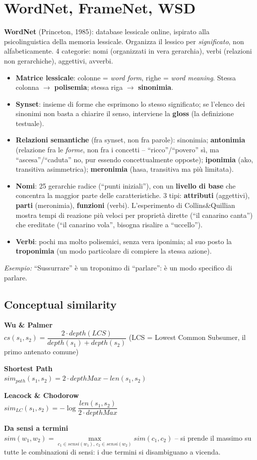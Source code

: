 \documentclass[11pt,a4paper]{article}
\newcommand{\formula}[2]{\begin{formulabox}\textbf{#1}\\[3pt]#2\end{formulabox}}
\newcommand{\es}[1]{\begin{esbox}\textit{Esempio:} #1\end{esbox}}
\begin{document}
\section{WordNet, FrameNet, WSD}

\textbf{WordNet} (Princeton, 1985): database lessicale online, ispirato alla psicolinguistica della memoria lessicale. Organizza il lessico per \emph{significato}, non alfabeticamente. 4 categorie: nomi (organizzati in vera gerarchia), verbi (relazioni non gerarchiche), aggettivi, avverbi.

\begin{itemize}
  \item \textbf{Matrice lessicale}: colonne = \emph{word form}, righe = \emph{word meaning}. Stessa colonna $\to$ \textbf{polisemia}; stessa riga $\to$ \textbf{sinonimia}.
  \item \textbf{Synset}: insieme di forme che esprimono lo stesso significato; se l'elenco dei sinonimi non basta a chiarire il senso, interviene la \textbf{gloss} (la definizione testuale).
  \item \textbf{Relazioni semantiche} (fra synset, non fra parole): sinonimia; \textbf{antonimia} (relazione fra le \emph{forme}, non fra i concetti -- ``ricco''/``povero'' s\`i, ma ``ascesa''/``caduta'' no, pur essendo concettualmente opposte); \textbf{iponimia} (ako, transitiva asimmetrica); \textbf{meronimia} (hasa, transitiva ma pi\`u limitata).
  \item \textbf{Nomi}: 25 gerarchie radice (``punti iniziali''), con un \textbf{livello di base} che concentra la maggior parte delle caratteristiche. 3 tipi: \textbf{attributi} (aggettivi), \textbf{parti} (meronimia), \textbf{funzioni} (verbi). L'esperimento di Collins\&Quillian mostra tempi di reazione pi\`u veloci per propriet\`a dirette (``il canarino canta'') che ereditate (``il canarino vola'', bisogna risalire a ``uccello'').
  \item \textbf{Verbi}: pochi ma molto polisemici, senza vera iponimia; al suo posto la \textbf{troponimia} (un modo particolare di compiere la stessa azione).
\end{itemize}
\es{``Sussurrare'' \`e un troponimo di ``parlare'': \`e un modo specifico di parlare.}

\subsection*{Conceptual similarity}
\formula{Wu \& Palmer}{$cs(s_1,s_2) = \dfrac{2\cdot depth(LCS)}{depth(s_1)+depth(s_2)}$ \quad (LCS = Lowest Common Subsumer, il primo antenato comune)}
\formula{Shortest Path}{$sim_{path}(s_1,s_2) = 2\cdot depthMax - len(s_1,s_2)$}
\formula{Leacock \& Chodorow}{$sim_{LC}(s_1,s_2) = -\log\dfrac{len(s_1,s_2)}{2\cdot depthMax}$}
\formula{Da sensi a termini}{$sim(w_1,w_2) = \max\limits_{c_1\in sensi(w_1),\,c_2\in sensi(w_2)} sim(c_1,c_2)$ -- si prende il massimo su tutte le combinazioni di sensi: i due termini si disambiguano a vicenda.}
\end{document}
